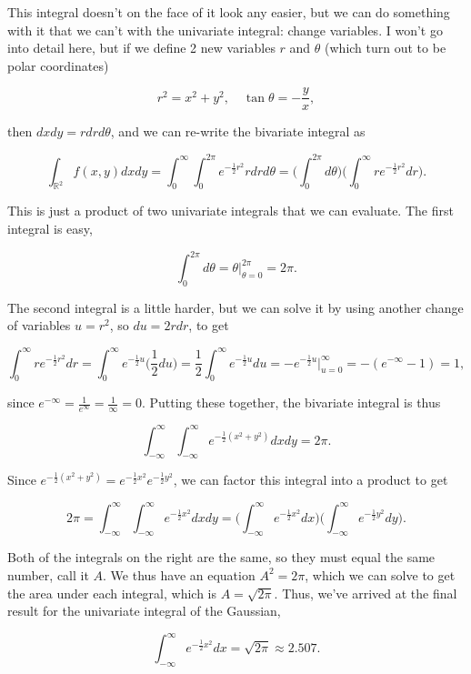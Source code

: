 \documentclass[
  letterpaper,
  DIV=11,
  numbers=noendperiod]{scrreprt}
\begin{document}
This integral doesn't on the face of it look any easier, but we can do
something with it that we can't with the univariate integral: change
variables. I won't go into detail here, but if we define 2 new variables
\(r\) and \(\theta\) (which turn out to be polar coordinates)

\[r^2 = x^2+y^2, \quad \tan \theta = -\frac{y}{x},\]

then \(dxdy = rdrd\theta\), and we can re-write the bivariate integral
as

\[\int_{\mathbb{R}^2} f(x,y) dxdy = \int_0^\infty \int_0^{2\pi} e^{-\frac{1}{2}r^2} rdrd\theta = \bigg(\int_0^{2\pi} d\theta \bigg) \bigg( \int_0^\infty re^{-\frac{1}{2}r^2} dr \bigg).\]

This is just a product of two univariate integrals that we can evaluate.
The first integral is easy,

\[\int_0^{2\pi} d\theta = \theta \bigg |_{\theta=0}^{2\pi} = 2\pi.\]

The second integral is a little harder, but we can solve it by using
another change of variables \(u=r^2\), so \(du = 2rdr\), to get

\[\int_0^\infty re^{-\frac{1}{2}r^2} dr = \int_0^\infty e^{-\frac{1}{2}u} \bigg(\frac{1}{2} du\bigg) = \frac{1}{2} \int_0^\infty e^{-\frac{1}{2}u} du = -e^{-\frac{1}{2}u} \bigg |_{u=0}^\infty = -(e^{-\infty} - 1) = 1,\]

since \(e^{-\infty} = \frac{1}{e^{\infty}} = \frac{1}{\infty} = 0\).
Putting these together, the bivariate integral is thus

\[\int_{-\infty}^\infty \int_{-\infty}^\infty e^{-\frac{1}{2} (x^2+y^2)} dxdy = 2\pi.\]

Since
\(e^{-\frac{1}{2} (x^2+y^2)} = e^{-\frac{1}{2} x^2} e^{-\frac{1}{2} y^2}\),
we can factor this integral into a product to get

\[2\pi = \int_{-\infty}^\infty \int_{-\infty}^\infty e^{-\frac{1}{2} x^2} dxdy = \bigg(\int_{-\infty}^\infty e^{-\frac{1}{2} x^2} dx \bigg) \bigg(\int_{-\infty}^\infty e^{-\frac{1}{2} y^2} dy\bigg).\]

Both of the integrals on the right are the same, so they must equal the
same number, call it \(A\). We thus have an equation \(A^2 = 2\pi\),
which we can solve to get the area under each integral, which is
\(A=\sqrt{2\pi}\). Thus, we've arrived at the final result for the
univariate integral of the Gaussian,

\[\int_{-\infty}^\infty e^{-\frac{1}{2} x^2} dx = \sqrt{2\pi} \approx 2.507.\]
\end{document}
